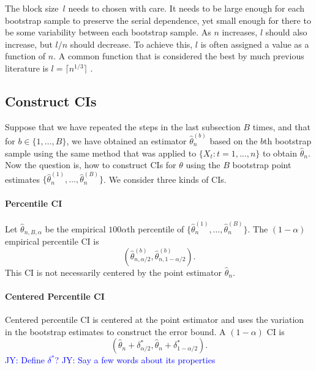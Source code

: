 \documentclass[12pt, letterpaper, titlepage]{article}
\newcommand{\jy}[1]{\textcolor{blue}{JY: #1}}
\begin{document}
The block size~$l$ needs to chosen with care. It needs to be large enough for
each bootstrap sample to preserve the serial dependence, yet small enough for
there to be some variability between each bootstrap sample. As $n$ increases,
$l$ should also increase, but $l / n$ should decrease. To achieve this, $l$ is
often assigned a value as a function of $n$. A common function that is
considered the best by much previous literature is $l = \lceil n^{1/3} \rceil$
\citep{buhlmann1999block}.


\subsection{Construct CIs}

Suppose that we have repeated the steps in the last subsection $B$ times, and
that for $b \in \{1, \ldots, B\}$, we have obtained an estimator
$\hat\theta_n^{(b)}$ based on the $b$th bootstrap sample using the same method
that was applied to $\{X_t: t = 1, \ldots, n\}$ to obtain $\hat\theta_n$.
Now the question is, how to construct CIs for $\theta$
using the $B$ bootstrap point estimates
$\{\hat\theta_n^{(1)}, \ldots, \hat\theta_n^{(B)}\}$.
We consider three kinds of CIs.


\paragraph{Percentile CI}
Let $\hat\theta_{n, B, \alpha}$ be the empirical $100\alpha$th percentile of
$\{\hat\theta_n^{(1)}, \ldots, \hat\theta_n^{(B)}\}$. The $(1 - \alpha)$
empirical percentile CI is
\[
(\hat\theta_{n, \alpha/2}^{(b)}, \hat\theta_{n, 1 - \alpha/2}^{(b)}).
\]
This CI is not necessarily centered by the point estimator $\hat\theta_n$.


\paragraph{Centered Percentile CI}
Centered percentile CI is centered at the point estimator and uses the variation
in the bootstrap estimates to construct the error bound. A $(1 - \alpha)$ CI is
\[
(\hat{\theta}_{n} + \delta^*_{\alpha/2},
\hat{\theta}_{n} + \delta^*_{1 - \alpha/2}).
\]
\jy{Define $\delta^*$?}
\jy{Say a few words about its properties}
\end{document}
